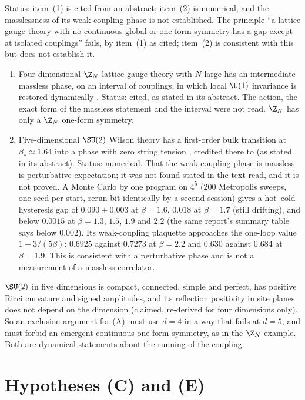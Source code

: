 \begin{observation}\label{neg:obs-excl}
Status: item~(1) is cited from an abstract; item~(2) is numerical, and the masslessness of its
weak-coupling phase is not established. The principle ``a lattice gauge theory with no continuous
global or one-form symmetry has a gap except at isolated couplings'' fails, by item~(1) as cited;
item~(2) is consistent with this but does not establish it.
\begin{enumerate}
\item Four-dimensional $\Z_N$ lattice gauge theory with $N$ large has an intermediate massless
phase, on an interval of couplings, in which local $\U(1)$ invariance is restored dynamically
\cite{FS82}. Status: cited, as stated in its abstract. The action, the exact form of the
massless statement and the interval were not read. $\Z_N$ has only a $\Z_N$ one-form symmetry.
\item Five-dimensional $\SU(2)$ Wilson theory has a first-order bulk transition at
$\beta_c\approx1.64$ into a phase with zero string tension \cite[\S3 and Fig.~1]{FiveD11},
credited there to \cite{Cr79} (as stated in its abstract). Status: numerical. That the
weak-coupling phase is massless is perturbative expectation; it was not found stated in the
text read, and it is not proved. A Monte Carlo by one program on $4^5$ (200 Metropolis sweeps,
one seed per start, rerun bit-identically by a second session) gives a
hot--cold hysteresis gap of $0.090\pm0.003$ at $\beta=1.6$, $0.018$ at $\beta=1.7$ (still
drifting), and below $0.0015$ at $\beta=1.3$, $1.5$, $1.9$ and $2.2$ (the same report's summary
table says below $0.002$). Its weak-coupling plaquette approaches the one-loop value
$1-3/(5\beta)$: $0.6925$ against $0.7273$ at $\beta=2.2$ and $0.630$ against $0.684$ at
$\beta=1.9$. This is consistent with a perturbative phase and is not a measurement of a massless
correlator.
\end{enumerate}
$\SU(2)$ in five dimensions is compact, connected, simple and perfect, has positive Ricci
curvature and signed amplitudes, and its reflection positivity in site planes does not depend on
the dimension (claimed, re-derived for four dimensions only). So an exclusion argument for (A)
must use $d=4$ in a way that fails at $d=5$, and must forbid an emergent continuous one-form
symmetry, as in the $\Z_N$ example. Both are dynamical statements about the running of the
coupling.
\end{observation}

\section{Hypotheses (C) and (E)}\label{sec:CE}

